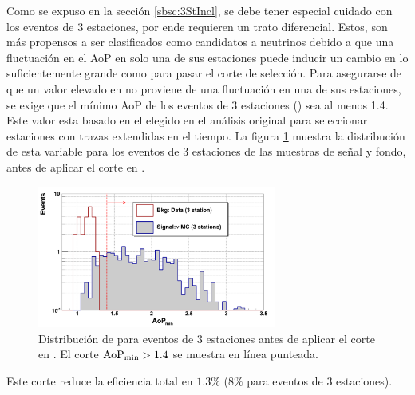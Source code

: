 	Como se expuso en la sección \ref{sbsc:3StIncl}, se debe tener especial cuidado con los eventos de 3 estaciones, por ende requieren un trato diferencial.
	Estos, son m\'as propensos a ser clasificados como candidatos a neutrinos debido a que una fluctuación en el AoP en solo una de sus estaciones puede inducir un cambio en \aop{} lo suficientemente grande como para pasar el corte de selección.
	Para asegurarse de que un valor elevado en \aop{} no proviene de una fluctuación en una de sus estaciones, se exige que el mínimo AoP de los eventos de 3 estaciones (\aopmin{}) sea al menos 1.4.
	Este valor esta basado en el elegido en el análisis original para seleccionar estaciones con trazas extendidas en el tiempo.
	La figura \ref{fig:minAoP} muestra la distribución de esta variable para los eventos de 3 estaciones de las muestras de señal y fondo, antes de aplicar el corte en \aop{}.
	\begin{figure}[ht]
	\begin{center}
	\includegraphics[width=0.7\textwidth]{fig/seleccionAuger/minAoP_forThesis}
	\caption{Distribución de \aopmin{} para eventos de 3 estaciones antes de aplicar el corte en \aop{}. El corte ${\rm AoP_{min}}>1.4$ se muestra en línea punteada.}
	\label{fig:minAoP}
	\end{center}
	\end{figure}
	Este corte reduce la eficiencia total en $1.3\%$ ($8\%$ para eventos de 3 estaciones).
	
